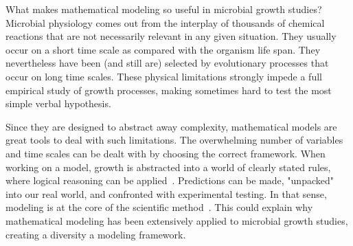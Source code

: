 What makes mathematical modeling so useful in microbial growth studies?
Microbial physiology comes out from the interplay of thousands of chemical reactions that are not necessarily relevant in any given situation.
They usually occur on a short time scale as compared with the organism life span.
They nevertheless have been (and still are) selected by evolutionary processes that occur on long time scales.
These physical limitations strongly impede a full empirical study of growth processes, making sometimes hard to test the most simple verbal hypothesis.

Since they are designed to abstract away complexity, mathematical models are great tools to deal with such limitations.
The overwhelming number of variables and time scales can be dealt with by choosing the correct framework.
When working on a model, growth is abstracted into a world of clearly stated rules, where logical reasoning can be applied~\cite{servedio_not_2014}.
Predictions can be made, "unpacked" into our real world, and confronted with experimental testing.
In that sense, modeling is at the core of the scientific method~\cite{mcgill_calm_2013}.
This could explain why mathematical modeling has been extensively applied to microbial growth studies, creating a diversity a modeling framework.

